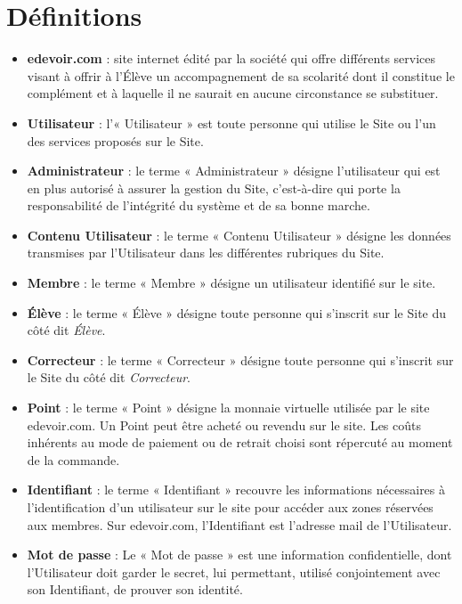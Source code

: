 \section{Définitions}

\begin{itemize}
  \item \textbf{edevoir.com} : site internet édité par la société \eDevoir qui offre différents services visant à offrir à l'\'Elève un accompagnement de sa scolarité dont il constitue le complément et à laquelle il ne saurait en aucune circonstance se substituer.

  \item \textbf{Utilisateur} : l'« Utilisateur » est toute personne qui utilise le Site ou l'un des services proposés sur le Site.

  \item \textbf{Administrateur} : le terme « Administrateur » désigne l'utilisateur qui est en plus autorisé à assurer la gestion du Site, c'est-à-dire qui porte la responsabilité de l'intégrité du système et de sa bonne marche.
  
  \item \textbf{Contenu Utilisateur} : le terme « Contenu Utilisateur » désigne les données transmises par l'Utilisateur dans les différentes rubriques du Site.

  \item \textbf{Membre} : le terme « Membre » désigne un utilisateur identifié sur le site.

  \item \textbf{\'Elève} : le terme « \'Elève » désigne toute personne qui s'inscrit sur le Site du côté dit \textit{\'Elève}.

  \item \textbf{Correcteur} : le terme « Correcteur » désigne toute personne qui s'inscrit sur le Site du côté dit \textit{Correcteur}.
  
  \item \textbf{Point} : le terme « Point » désigne la monnaie virtuelle utilisée par le site edevoir.com. Un Point peut être acheté ou revendu sur le site. Les coûts inhérents au mode de paiement ou de retrait choisi sont répercuté au moment de la commande.

  \item \textbf{Identifiant} : le terme « Identifiant » recouvre les informations nécessaires à l'identification d'un utilisateur sur le site pour accéder aux zones réservées aux membres. Sur edevoir.com, l'Identifiant est l'adresse mail de l'Utilisateur.

  \item \textbf{Mot de passe} : Le « Mot de passe » est une information confidentielle, dont l'Utilisateur doit garder le secret, lui permettant, utilisé conjointement avec son Identifiant, de prouver son identité.
\end{itemize}


